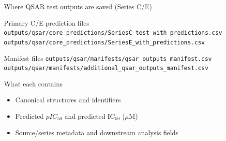 \documentclass[aspectratio=169,10pt]{beamer}
\begin{document}
\begin{frame}{Where QSAR test outputs are saved (Series C/E)}
  \small
  \begin{block}{Primary C/E prediction files}
    {\scriptsize\texttt{outputs/qsar/core\_predictions/SeriesC\_test\_with\_predictions.csv}}\\
    {\scriptsize\texttt{outputs/qsar/core\_predictions/SeriesE\_with\_predictions.csv}}
  \end{block}

  \begin{block}{Manifest files}
    {\scriptsize\texttt{outputs/qsar/manifests/qsar\_outputs\_manifest.csv}}\\
    {\scriptsize\texttt{outputs/qsar/manifests/additional\_qsar\_outputs\_manifest.csv}}
  \end{block}

  \begin{exampleblock}{What each contains}
    \begin{itemize}
      \item Canonical structures and identifiers
      \item Predicted \(pIC_{50}\) and predicted IC\(_{50}\) (\(\mu\)M)
      \item Source/series metadata and downstream analysis fields
    \end{itemize}
  \end{exampleblock}
\end{frame}
\end{document}
